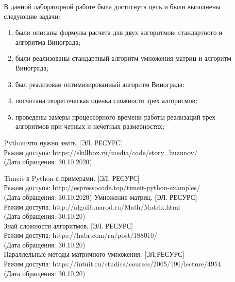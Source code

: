 \documentclass[a4paper]{article}
\begin{document}
	В данной лабораторной работе была достигнута цель и были выполнены следующие задачи:
	\begin{enumerate}
		\item были описаны формулы расчета для двух алгоритмов: стандартного и алгоритма Винограда;
		\item были реализованы стандартный алгоритм умножения матриц и алгоритм Винограда;
		\item был реализован оптимизированный алгоритм Винограда;
		\item посчитана теоретическая оценка сложности трех алгоритмов;
		\item проведены замеры процессорного времени работы реализаций трех алгоритмов при четных и нечетных размерностях;
		
	\end{enumerate}
	\clearpage
	
	\begin{thebibliography}{5}
		Python:что нужно знать. [ЭЛ. РЕСУРС]\\
		Режим доступа: https://skillbox.ru/media/code/story\_buzunov/ \\
		(Дата обращения: 30.10.2020)
		
		Timeit в Python с примерами. [ЭЛ. РЕСУРС]\\
		Режим доступа: http://espressocode.top/timeit-python-examples/ \\
		(Дата обращения: 30.10.2020)
		Умножение матриц. [ЭЛ. РЕСУРС] \\
		Режим доступа: http://algolib.narod.ru/Math/Matrix.html \\
		(Дата обращения: 30.10.20)\\
		
		Знай сложности алгоритмов. [ЭЛ. РЕСУРС] \\
		Режим доступа: https://habr.com/ru/post/188010/ \\
		(Дата обращения: 30.10.20)\\
		
		Параллельные методы матричного умножения. [ЭЛ.РЕСУРС] \\
		Режим доступа: https://intuit.ru/studies/courses/2065/190/lecture/4954 \\
		(Дата обращения: 30.10.20)\\
	\end{thebibliography}
\end{document}
